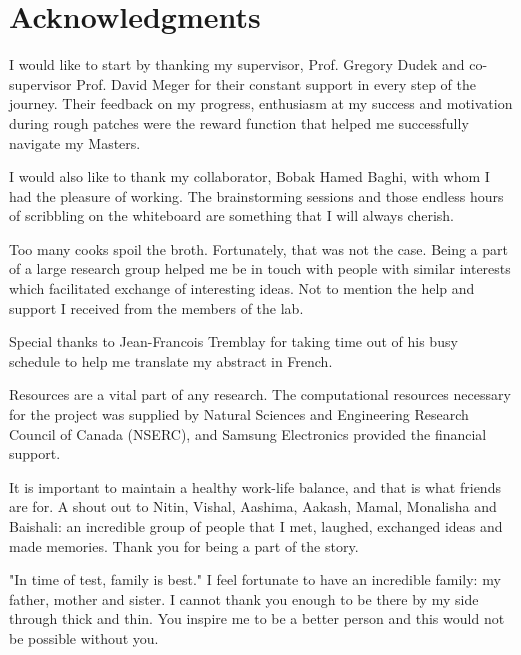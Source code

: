\chapter*{\rm\bfseries Acknowledgments}

I would like to start by thanking my supervisor, Prof. Gregory Dudek and co-supervisor Prof. David Meger for their constant support in every step of the journey. Their feedback on my progress, enthusiasm at my success and motivation during rough patches were the reward function that helped me successfully navigate my Masters. %

I would also like to thank my collaborator, Bobak Hamed Baghi, with whom I had the pleasure of working. The brainstorming sessions and those endless hours of scribbling on the whiteboard are something that I will always cherish.  


Too many cooks spoil the broth. Fortunately, that was not the case. Being a part of a large research group helped me be in touch with people with similar interests which facilitated exchange of interesting ideas. Not to mention the help and support I received from the members of the lab. %

Special thanks to Jean-Francois Tremblay for taking time out of his busy schedule to help me translate my abstract in French.


Resources are a vital part of any research. The computational resources necessary for the project was supplied by Natural Sciences and Engineering Research Council of Canada (NSERC), and Samsung Electronics provided the financial support.


It is important to maintain a healthy work-life balance, and that is what friends are for. A shout out to Nitin, Vishal, Aashima, Aakash, Mamal, Monalisha and Baishali: an incredible group of people that I met, laughed, exchanged ideas and made memories. Thank you for being a part of the story.

"In time of test, family is best." I feel fortunate to have an incredible family: my father, mother and sister. I cannot thank you enough to be there by my side through thick and thin. You inspire me to be a better person and this would not be possible without you.


